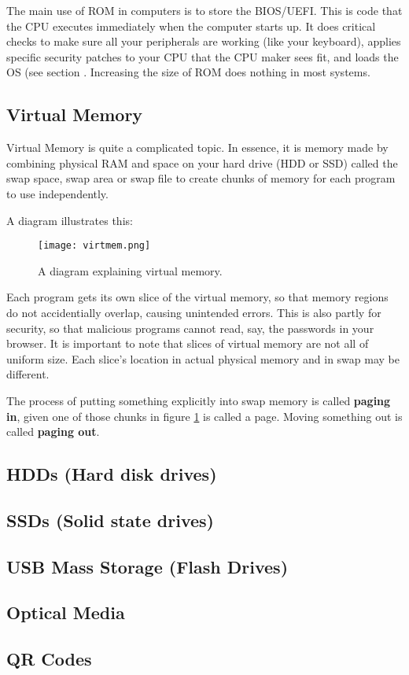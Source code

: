 \documentclass[../main.tex]{subfiles}
\begin{document}
The main use of ROM in computers is to store the BIOS/UEFI. This is code that the CPU executes immediately when the computer starts up. It does critical checks to make sure all your peripherals are working (like your keyboard), applies specific security patches to your CPU that the CPU maker sees fit, and loads the OS (see section \label{4:sec:the_os_and_kernel}. Increasing the size of ROM does nothing in most systems.

\subsection{Virtual Memory}

Virtual Memory is quite a complicated topic. In essence, it is memory made by combining physical RAM and space on your hard drive (HDD or SSD) called the swap space, swap area or swap file to create chunks of memory for each program to use independently.

A diagram illustrates this:

\begin{figure}[H]
    \centering
    \texttt{[image: virtmem.png]}
    \caption{A diagram explaining virtual memory.}
    \label{fig:virtmem}
\end{figure}

Each program gets its own slice of the virtual memory, so that memory regions do not accidentially overlap, causing unintended errors. This is also partly for security, so that malicious programs cannot read, say, the passwords in your browser. It is important to note that slices of virtual memory are not all of uniform size. Each slice's location in actual physical memory and in swap may be different.

The process of putting something explicitly into swap memory is called \textbf{paging in}, given one of those chunks in figure \ref{fig:virtmem} is called a page. Moving something out is called \textbf{paging out}.

\subsection{HDDs (Hard disk drives)}


\subsection{SSDs (Solid state drives)}

\subsection{USB Mass Storage (Flash Drives)}

\subsection{Optical Media}

\subsection{QR Codes}
\end{document}
